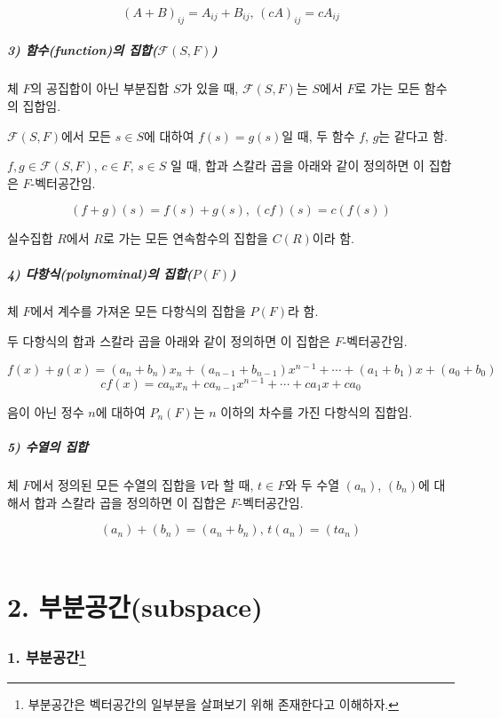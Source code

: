\documentclass[10pt, a4paper]{article}
\begin{document}
\[(A+B)_{ij}=A_{ij}+B_{ij},\,(cA)_{ij}=cA_{ij}\]


\subsubsection*{3) 함수(function)의 집합($\mathcal{F}(S,F)$)}
체 $F$의 공집합이 아닌 부분집합 $S$가 있을 때, $\mathcal{F}(S,F)$는 $S$에서 $F$로 가는 모든 함수의 집합임.

$\mathcal{F}(S,F)$에서 모든 $s \in S$에 대하여 $f(s)=g(s)$일 때, 두 함수 $f$, $g$는 같다고 함.

$f,g \in \mathcal{F}(S,F)$, $c \in F$, $s \in S$ 일 때, 합과 스칼라 곱을 아래와 같이 정의하면 이 집합은 $F$-벡터공간임.

\[(f+g)(s)=f(s)+g(s),\,(cf)(s)=c(f(s))\]

실수집합 $R$에서 $R$로 가는 모든 연속함수의 집합을 $C(R)$이라 함.\\


\subsubsection*{4) 다항식(polynominal)의 집합($P(F)$)}
체 $F$에서 계수를 가져온 모든 다항식의 집합을 $P(F)$라 함.

두 다항식의 합과 스칼라 곱을 아래와 같이 정의하면 이 집합은 $F$-벡터공간임.

\[f(x)+g(x)=(a_n+b_n)x_n+(a_{n-1}+b_{n-1})x^{n-1}+ \cdots +(a_1+b_1)x+(a_0+b_0)\]
\[cf(x)=ca_nx_n+ca_{n-1}x^{n-1}+ \cdots +ca_1x+ca_0\]

음이 아닌 정수 $n$에 대하여 $P_n(F)$는 $n$ 이하의 차수를 가진 다항식의 집합임.


\subsubsection*{5) 수열의 집합}
체 $F$에서 정의된 모든 수열의 집합을 $V$라 할 때, $t \in F$와 두 수열 $(a_n)$, $(b_n)$에 대해서 합과 스칼라 곱을 정의하면 이 집합은 $F$-벡터공간임.

\[(a_n)+(b_n)=(a_n+b_n),\,t(a_n)=(ta_n)\]\\


\newpage


\part*{2. 부분공간(subspace)}

\section*{1. 부분공간\footnote{부분공간은 벡터공간의 일부분을 살펴보기 위해 존재한다고 이해하자.}}
\end{document}
